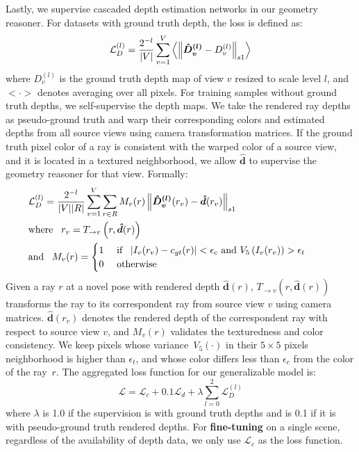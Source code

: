 Lastly, we supervise cascaded depth estimation networks in our geometry reasoner. For datasets with ground truth depth, the loss is defined as:
\begin{equation}
    \mathcal{L}^{(l)}_{D} = \frac{2^{- l}}{|V|} \sum_{v=1}^{V} \left < \left\lVert \boldsymbol{\hat{D}^{(l)}_{v}} - D^{(l)}_{v}\right\rVert_{s1} \right >
\end{equation}
where $D^{(l)}_{v}$ is the ground truth depth map of view $v$ resized to scale level $l$, and $< \cdot >$ denotes averaging over all pixels. For training samples without ground truth depths, we self-supervise the depth maps. We take the rendered ray depths as pseudo-ground truth and warp their corresponding colors and estimated depths from all source views using camera transformation matrices. If the ground truth pixel color of a ray is consistent with the warped color of a source view, and it is located in a textured neighborhood, we allow $\boldsymbol{\hat{d}}$ to supervise the geometry reasoner for that view. Formally:
\begin{align}
        & \mathcal{L}^{(l)}_{D} = \frac{2^{- l}}{|V||R|} \sum_{v=1}^{V} \sum_{r \in R} M_{v}(r) \norm{ \boldsymbol{\hat{D}^{(l)}_{v}}(r_v) - \boldsymbol{\hat{d}}(r_v)}_{s1} \notag
        \\
        & \text{where } \phantom{0} r_{v} = T_{\rightarrow v}\left(r, \boldsymbol{\hat{d}}(r)\right)
        \\
        & \text{and } \phantom{0} M_{v}(r) = 
        \begin{cases} 
            1 & \text{ if } \phantom{0}
            \parbox[t]{0.6\linewidth}{
                $\abs{ I_{v}(r_v) - c_{gt}(r)} < \epsilon_c $ and $V_5 \left( I_{v}(r_v) \right) > \epsilon_t$
            }
            \\
            0 & \text{ otherwise }
        \end{cases} \notag
\end{align}
Given a ray $r$ at a novel pose with rendered depth $\boldsymbol{\hat{d}}(r)$, $T_{\rightarrow v}\left(r, \boldsymbol{\hat{d}}(r)\right)$ transforms the ray to its correspondent ray from source view $v$ using camera matrices. $\boldsymbol{\hat{d}}(r_v)$ denotes the rendered depth of the correspondent ray with respect to source view $v$, and $M_{v}(r)$ validates the texturedness and color consistency. We keep pixels whose variance~$V_5(\cdot)$ in their $5 \times 5$ pixels neighborhood is higher than $\epsilon_t$, and whose color differs less than $\epsilon_c$ from the color of the ray~$r$. The aggregated loss function for our generalizable model is:
\begin{equation}
    \mathcal{L} = \mathcal{L}_{c} + 0.1 \mathcal{L}_{d} + \lambda \sum_{l=0}^{2}\mathcal{L}^{(l)}_{D}
\end{equation}
where $\lambda$ is 1.0 if the supervision is with ground truth depths and is 0.1 if it is with pseudo-ground truth rendered depths. For \textbf{fine-tuning} on a single scene, regardless of the availability of depth data, we only use $\mathcal{L}_{c}$ as the loss function.

